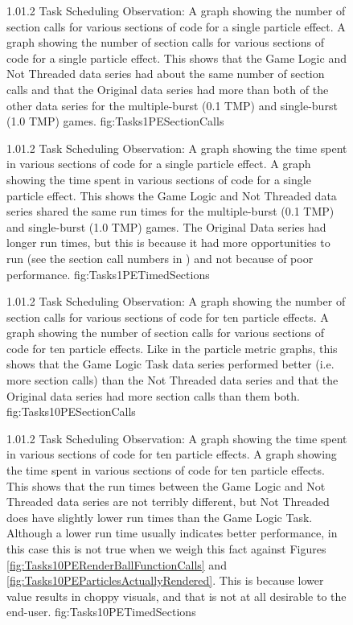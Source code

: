 \begin{figure}
\addtocounter{figure}{-1}

	\vspace{-1.5cm}
	{1.0}{1.2}
	{Task Scheduling Observation: A graph showing the number of section calls for various sections of code for a single particle effect.}
	{A graph showing the number of section calls for various sections of code for a single particle effect. This shows that the Game Logic and Not Threaded data series had about the same number of section calls and that the Original data series had more than both of the other data series for the multiple-burst (0.1 TMP) and single-burst (1.0 TMP) games.}
	{fig:Tasks1PESectionCalls}

	{1.0}{1.2}
	{Task Scheduling Observation: A graph showing the time spent in various sections of code for a single particle effect.}
	{A graph showing the time spent in various sections of code for a single particle effect. This shows the Game Logic and Not Threaded data series shared the same run times for the multiple-burst (0.1 TMP) and single-burst (1.0 TMP) games. The Original Data series had longer run times, but this is because it had more opportunities to run (see the section call numbers in ) and not because of poor performance. }
	{fig:Tasks1PETimedSections}

\end{figure}

\begin{figure}
\addtocounter{figure}{-1}

	\vspace{-1.5cm}
	{1.0}{1.2}
	{Task Scheduling Observation: A graph showing the number of section calls for various sections of code for ten particle effects.}
	{A graph showing the number of section calls for various sections of code for ten particle effects. Like in the particle metric graphs, this shows that the Game Logic Task data series performed better (i.e. more section calls) than the Not Threaded data series and that the Original data series had more section calls than them both.}
	{fig:Tasks10PESectionCalls}

	{1.0}{1.2}
	{Task Scheduling Observation: A graph showing the time spent in various sections of code for ten particle effects.}
	{A graph showing the time spent in various sections of code for ten particle effects. This shows that the run times between the Game Logic and Not Threaded data series are not terribly different, but Not Threaded does have slightly lower run times than the Game Logic Task. Although a lower run time usually indicates better performance, in this case this is not true when we weigh this fact against Figures \ref{fig:Tasks10PERenderBallFunctionCalls} and \ref{fig:Tasks10PEParticlesActuallyRendered}. This is because lower  value results in choppy visuals, and that is not at all desirable to the end-user.}
	{fig:Tasks10PETimedSections}

\end{figure}

